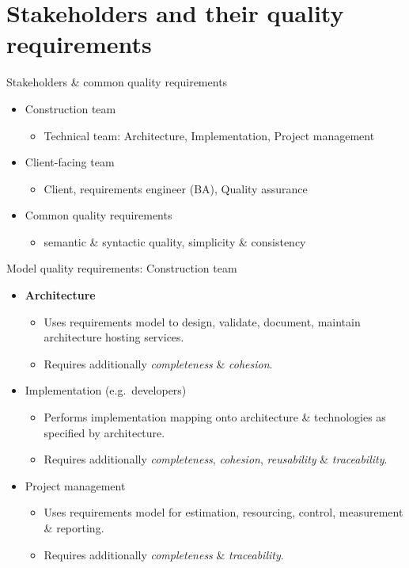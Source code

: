 \section{Stakeholders and their quality requirements}

\begin{frame}{Stakeholders \& common quality requirements}                      
  \begin{itemize} 
    \item<+-| alert@+> Construction team
      \begin{itemize}
	\item Technical team: Architecture, Implementation, Project management
      \end{itemize}
    \item<+-| alert@+> Client-facing team
      \begin{itemize}
	\item Client, requirements engineer (BA), Quality assurance
      \end{itemize}
    \item<+-| alert@+> Common quality requirements
      \begin{itemize}
	\item semantic \& syntactic quality, simplicity \& consistency
      \end{itemize}
  \end{itemize}
\end{frame}


\begin{frame}{Model quality requirements: Construction team}                      
  \begin{itemize} 
    \item<+-| alert@+> {\bf Architecture} 
      \begin{itemize}
        \item Uses requirements model to design, validate, document, maintain architecture hosting services.
        \item Requires additionally {\em completeness} \& {\em cohesion}.
      \end{itemize}
    \item<+-| alert@+> Implementation (e.g.\ developers)
      \begin{itemize}
	\item Performs implementation mapping onto architecture \& technologies as specified by architecture.
	\item Requires additionally {\em completeness}, {\em cohesion}, {\em reusability} \& {\em traceability}.
      \end{itemize}
    \item<+-| alert@+> Project management
      \begin{itemize}
	\item Uses requirements model for estimation, resourcing, control, measurement \& reporting.
	\item Requires additionally {\em completeness} \& {\em traceability}.
      \end{itemize}
  \end{itemize}
\end{frame}

